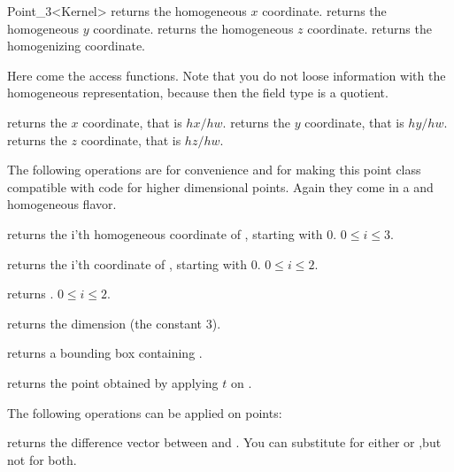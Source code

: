 \begin{ccRefClass} {Point_3<Kernel>}
       {returns the homogeneous $x$ coordinate.}
\ccGlue
{}
       {returns the homogeneous $y$ coordinate.}
\ccGlue
{}
       {returns the homogeneous $z$ coordinate.}
\ccGlue
{}
       {returns the homogenizing  coordinate.}

Here come the  access functions. Note that you do not loose
information with the homogeneous representation, because then the field
type is a quotient.

       {returns the  $x$ coordinate, that is $hx/hw$.}
\ccGlue
{}
       {returns the  $y$ coordinate, that is $hy/hw$.}
\ccGlue
{}
       {returns the  $z$ coordinate, that is $hz/hw$.}


The following operations are for convenience and for making this
point class compatible with code for higher dimensional points.
Again they come in a  and homogeneous flavor.

       {returns the i'th homogeneous coordinate of \ccVar, starting with 0.
        \ccPrecond $0\leq i \leq 3$.}

       {returns the i'th  coordinate of \ccVar, starting with 0.
        \ccPrecond $0\leq i \leq 2$.}

       {returns .
        \ccPrecond $0\leq i \leq 2$.}

       {returns the dimension (the constant 3).}

       {returns a bounding box containing \ccVar.}

       {returns the point obtained by applying $t$ on \ccVar.}


The following operations can be applied on points:

       {returns the difference vector between  and . 
        You can substitute  for either  or 
        ,but not for both.}


\end{ccRefClass}
